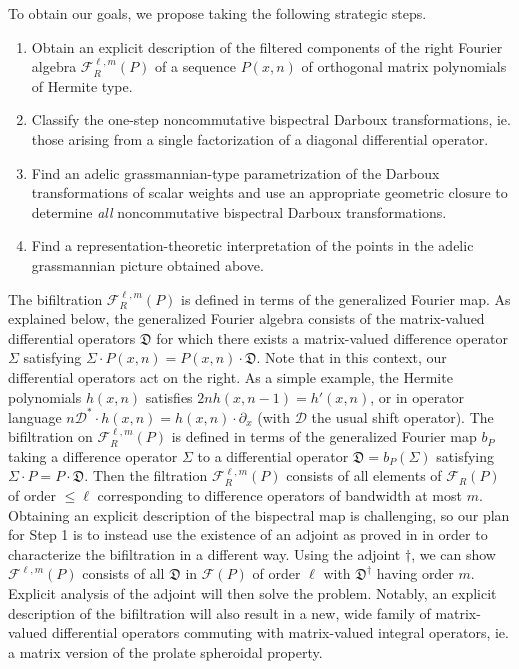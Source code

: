 \documentclass[11pt,letterpaper]{article}
\theoremstyle{definition}
\begin{document}
To obtain our goals, we propose taking the following strategic steps.
\begin{enumerate}[(Step 1)]
\item Obtain an explicit description of the filtered components of the right Fourier algebra $\mathcal F_R^{\ell,m}(P)$ of a sequence $P(x,n)$ of orthogonal matrix polynomials of Hermite type. 
\item Classify the one-step noncommutative bispectral Darboux transformations, ie. those arising from a single factorization of a diagonal differential operator.
\item Find an adelic grassmannian-type parametrization of the Darboux transformations of scalar weights and use an appropriate geometric closure to determine \emph{all} noncommutative bispectral Darboux transformations.
\item Find a representation-theoretic interpretation of the points in the adelic grassmannian picture obtained above.
\end{enumerate}
The bifiltration $\mathcal F_R^{\ell,m}(P)$ is defined in terms of the generalized Fourier map.
As explained below, the generalized Fourier algebra consists of the matrix-valued differential operators $\mathfrak D$ for which there exists a matrix-valued difference operator $\Sigma$ satisfying $\Sigma\cdot P(x,n) = P(x,n)\cdot\mathfrak D$.  Note that in this context, our differential operators act on the right.  As a simple example, the Hermite polynomials $h(x,n)$ satisfies $2nh(x,n-1)= h'(x,n)$, or in operator language $n\mathscr D^*\cdot h(x,n)= h(x,n)\cdot\partial_x$ (with $\mathscr D$ the usual shift operator).
The bifiltration on $\mathcal F_R^{\ell,m}(P)$ is defined in terms of the generalized Fourier map $b_P$ taking a difference operator $\Sigma$ to a differential operator $\mathfrak D=b_P(\Sigma)$ satisfying $\Sigma\cdot P=P\cdot\mathfrak D$.
Then the filtration $\mathcal F_R^{\ell,m}(P)$ consists of all elements of $\mathcal F_R(P)$ of order $\leq \ell$ corresponding to difference operators of bandwidth at most $m$.
Obtaining an explicit description of the bispectral map is challenging, so our plan for Step 1 is to instead use the existence of an adjoint as proved in \cite{CY2018} in order to characterize the bifiltration in a different way.
Using the adjoint $\dag$, we can show $\mathcal F^{\ell,m}(P)$ consists of all $\mathfrak D$ in $\mathcal F(P)$ of order $\ell$ with $\mathfrak D^\dag$ having order $m$.  Explicit analysis of the adjoint will then solve the problem.
Notably, an explicit description of the bifiltration will also result in a new, wide family of matrix-valued differential operators commuting with matrix-valued integral operators, ie. a matrix version of the prolate spheroidal property.
\end{document}
